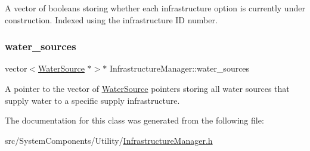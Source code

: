 A vector of booleans storing whether each infrastructure option is currently under construction. Indexed using the infrastructure ID number. 

\mbox{\label{classInfrastructureManager_a2b8810958d40b9c80d299c6db31715e2}} 
\subsubsection{\texorpdfstring{water\+\_\+sources}{water\_sources}}
{\footnotesize\ttfamily vector$<$\mbox{\hyperlink{classWaterSource}{Water\+Source}} $\ast$$>$$\ast$ Infrastructure\+Manager\+::water\+\_\+sources\hspace{0.3cm}{\ttfamily [private]}}



A pointer to the vector of \mbox{\hyperlink{classWaterSource}{Water\+Source}} pointers storing all water sources that supply water to a specific supply infrastructure. 



The documentation for this class was generated from the following file\+:\begin{DoxyCompactItemize}
\item 
src/\+System\+Components/\+Utility/\mbox{\hyperlink{InfrastructureManager_8h}{Infrastructure\+Manager.\+h}}\end{DoxyCompactItemize}
